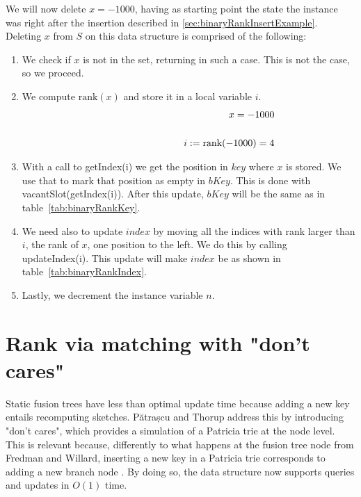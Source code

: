 We will now delete $x = -1000$, having as starting point the state the instance was right after the insertion described in \ref{sec:binaryRankInsertExample}. Deleting $x$ from $S$ on this data structure is comprised of the following:
\begin{enumerate}
    \item
    We check if $x$ is not in the set, returning in such a case.
    This is not the case, so we proceed.
    
    \item
    We compute $\text{rank}(x)$ and store it in a local variable $i$.
    \begin{align*}
        x = -1000 \\
        \cline{1-2}
        i := \text{rank}(-1000) = 4
    \end{align*}
    
    \item
    With a call to {\ttfamily getIndex(i)} we get the position in $key$ where $x$ is stored. We use that to mark that position as empty in $bKey$. This is done with {\ttfamily vacantSlot(getIndex(i))}. After this update, $bKey$ will be the same as in table~\ref{tab:binaryRankKey}.
    
    \item
    We need also to update $index$ by moving all the indices with rank larger than $i$, the rank of $x$, one position to the left. We do this by calling {\ttfamily updateIndex(i)}. This update will make $index$ be as shown in table~\ref{tab:binaryRankIndex}.
    
    \item
    Lastly, we decrement the instance variable $n$.
\end{enumerate}





\newpage
\section{Rank via matching with "don't cares"} \label{sec:rankWithDontCares}

Static fusion trees have less than optimal update time because adding a new key entails recomputing sketches. Pătrașcu and Thorup address this by introducing "don't cares", which provides a simulation of a Patricia trie at the node level. This is relevant because, differently to what happens at the fusion tree node from Fredman and Willard, inserting a new key in a Patricia trie corresponds to adding a new branch node \cite{patrascu2014dynamic}. By doing so, the data structure now supports queries and updates in $O(1)$ time.

